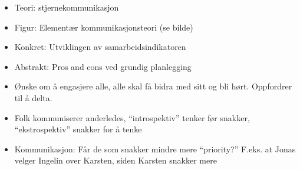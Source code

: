 \begin{itemize}
\item Teori: stjernekommunikasjon
\item Figur: Elementær kommunikasjonsteori (se bilde)
\item Konkret: Utviklingen av samarbeidsindikatoren
\item Abstrakt: Pros and cons ved grundig planlegging
\item Ønske om å engasjere alle, alle skal få bidra med sitt og bli hørt. Oppfordrer til å delta.
\item Folk kommuniserer anderledes, “introspektiv” tenker før snakker, “ekstrospektiv” snakker for å tenke
\item Kommunikasjon: Får de som snakker mindre mere “priority?” F.eks. at Jonas velger Ingelin over Karsten, siden Karsten snakker mere
\end{itemize}





















